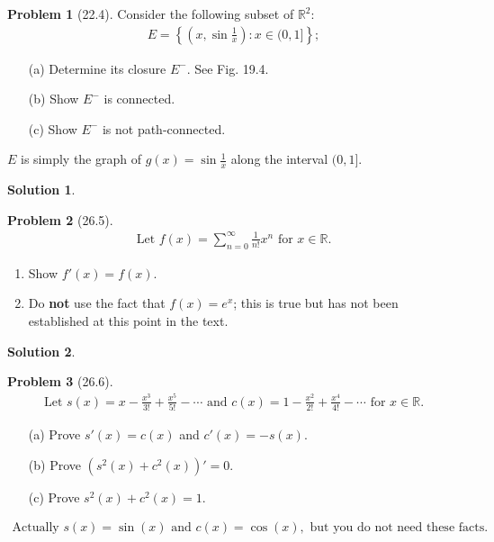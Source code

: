 \documentclass[12pt]{article}
\theoremstyle{definition} %
\newtheorem{solution}{Solution}
\newtheorem{problem}{Problem}
\theoremstyle{plain} %
\begin{document}
\begin{problem}[22.4]
        Consider the following subset of $\mathbb{R}^2$: 
    \begin{align}
        E = \left\{ \left( x, \sin\frac{1}{x} \right) : x \in (0, 1] \right\};
    \end{align}
    \begin{enumerate}
        \item[(a)] Determine its closure \( E^- \). See Fig. 19.4.
        \item[(b)] Show \( E^- \) is connected.
        \item[(c)] Show \( E^- \) is not path-connected.
    \end{enumerate}
        $E$ is simply the graph of $g(x) = \sin\frac{1}{x}$ along the interval $(0, 1]$.
\end{problem}
\begin{solution}
\end{solution}
\begin{problem}[26.5]
    \begin{align}
        \text{Let } f(x) = \sum_{n=0}^\infty \frac{1}{n!} x^n \text{ for } x \in \mathbb{R}.
    \end{align}
    \begin{enumerate}
        \item Show \( f'(x) = f(x) \).
        \item Do \textbf{not} use the fact that \( f(x) = e^x \); this is true but has not been established at this point in the text.
    \end{enumerate}
\end{problem}
\begin{solution}
    
\end{solution}
\begin{problem}[26.6]
    \begin{align}
        \text{Let } s(x) = x - \frac{x^3}{3!} + \frac{x^5}{5!} - \cdots \text{ and } c(x) = 1 - \frac{x^2}{2!} + \frac{x^4}{4!} - \cdots \text{ for } x \in \mathbb{R}.
    \end{align}
    \begin{enumerate}
        \item[(a)] Prove \( s'(x) = c(x) \) and \( c'(x) = -s(x) \).
        \item[(b)] Prove \( (s^2(x) + c^2(x))' = 0 \).
        \item[(c)] Prove \( s^2(x) + c^2(x) = 1 \).
    \end{enumerate}
    \begin{align}
        \text{Actually } s(x) = \sin(x) \text{ and } c(x) = \cos(x), \text{ but you do not need these facts.}
    \end{align}
\end{problem}
\end{document}
